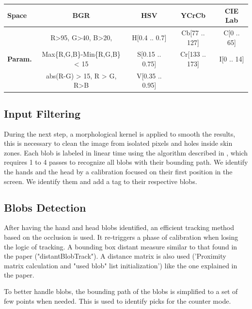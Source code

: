 \documentclass{llncs}
\newcommand\ignore[1]{}
\begin{document}
\begin{center}
\begin{tabular}{|l|c|c|c|c|}
\hline
\textbf{Space} & BGR & HSV & YCrCb & CIE Lab\\
\hline
 & R>95, G>40, B>20, & H[0.4 .. 0.7] & Cb[77 .. 127] & C[0 .. 65] \\
\textbf{Param.} & Max\{R,G,B\}-Min\{R,G,B\} < 15 & S[0.15 .. 0.75] & Cr[133 .. 173] & I[0 .. 14] \\
 & abs(R-G) > 15, R > G, R>B & V[0.35 .. 0.95] & & \\
\hline
\end{tabular}
\end{center}

\subsection{Input Filtering}
During the next step, a morphological kernel is applied to smooth the results, this is necessary
to clean the image from isolated pixels and holes inside skin zones.
Each blob is labeled in linear time using the algorithm described in \cite{CompLabeling} , which requires 1 to 4 passes to recognize all blobs with their bounding path.
We identify the hands and the head by a calibration focused on their first position in the screen. We identify them and add a tag to their respective blobs.

\subsection{Blobs Detection}
After having the hand and head blobs identified, an efficient tracking method based on the occlusion is used. It re-triggers a phase of calibration when losing the logic of tracking.
A bounding box distant measure similar to that found in the paper \cite{app06} ("distantBlobTrack"). A distance matrix is also used ('Proximity matrix calculation and "used blob" list initialization') like the one explained in the paper. 
\ignore{
When the matrix of distance is set up, there are some loops:
* A loop for detect inactive tracks: those tracks with no blobs near.
* Detect and create new tracks: those blobs without a track near.
* A loop to assign blobs to tracks. It makes clusters with blobs that are close and assign them to a track. In this step some tracks could merge in one.
* At the end, all inactive tracks are checked to delete the old ones.
}
To better handle blobs, the bounding path of the blobs is simplified to a set of few points when needed. This is used to identify picks for the counter mode.
\end{document}
